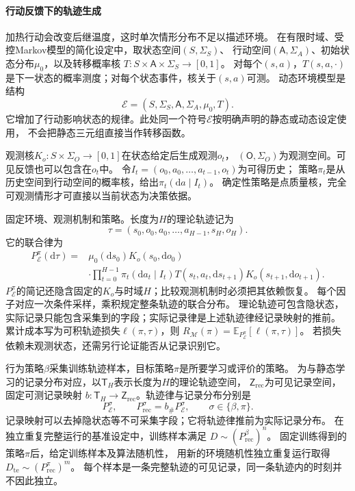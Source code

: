 \paragraph{行动反馈下的轨迹生成}
\label{sec:future-interactive-learning-process}

加热行动会改变后继温度，这时单次情形分布不足以描述环境。
在有限时域、受控Markov模型的简化设定中，取状态空间$(S,\Sigma_S)$、
行动空间$(\mathsf A,\Sigma_A)$、初始状态分布$\mu_0$，以及转移概率核
$T:S\times\mathsf A\times\Sigma_S\to[0,1]$。
对每个$(s,a)$，$T(s,a,\cdot)$是下一状态的概率测度；对每个状态事件，核关于$(s,a)$可测。
动态环境模型是结构
\[
  \mathcal E=(S,\Sigma_S,\mathsf A,\Sigma_A,\mu_0,T).
\]
它增加了行动影响状态的规律。此处同一个符号$\mathcal E$按明确声明的静态或动态设定使用，
不会把静态三元组直接当作转移函数。

观测核$K_o:S\times\Sigma_O\to[0,1]$在状态给定后生成观测$o_t$，
$(\mathsf O,\Sigma_O)$为观测空间。可见反馈也可以包含在$o_t$中。
令$I_t=(o_0,a_0,\ldots,a_{t-1},o_t)$为可得历史；
策略$\pi_t$是从历史空间到行动空间的概率核，给出$\pi_t(\mathrm da\mid I_t)$。
确定性策略是点质量核，完全可观测情形才可直接以当前状态为决策依据。

固定环境、观测机制和策略。长度为$H$的理论轨迹记为
\[
  \tau=(s_0,o_0,a_0,\ldots,a_{H-1},s_H,o_H).
\]
它的联合律为
\begin{equation}
  \begin{aligned}
    P_{\mathcal E}^{\pi}(\mathrm d\tau)
    ={}&\mu_0(\mathrm ds_0)K_o(s_0,\mathrm do_0)\\
      &\cdot\prod_{t=0}^{H-1}
      \pi_t(\mathrm da_t\mid I_t)
      T(s_t,a_t,\mathrm ds_{t+1})K_o(s_{t+1},\mathrm do_{t+1}).
  \end{aligned}
  \label{eq:future-interactive-trajectory-law}
\end{equation}
$P_{\mathcal E}^{\pi}$的简记还隐含固定的$K_o$与时域$H$；比较观测机制时必须把其依赖恢复。
每个因子对应一次条件采样，乘积规定整条轨迹的联合分布。
理论轨迹可包含隐状态，实际记录只能包含采集到的字段；实际记录律是上述轨迹律经记录映射的推前。
累计成本写为可积轨迹损失$\ell(\pi,\tau)$，则
$R_{\mathcal M}(\pi)=\mathbb E_{P_{\mathcal E}^{\pi}}[\ell(\pi,\tau)]$。
若损失依赖未观测状态，还需另行论证能否从记录识别它。

行为策略$\beta$采集训练轨迹样本，目标策略$\pi$是所要学习或评价的策略。
为与静态学习的记录分布对应，以$\mathsf T_H$表示长度为$H$的理论轨迹空间，
$\mathsf Z_{\mathrm{rec}}$为可见记录空间，固定可测记录映射
$b:\mathsf T_H\to\mathsf Z_{\mathrm{rec}}$。轨迹律与记录分布分别是
\[
  P_{\mathcal E}^{\sigma},\qquad
  P_{\mathrm{rec}}^{\sigma}=b_{\#}P_{\mathcal E}^{\sigma},
  \qquad \sigma\in\{\beta,\pi\}.
\]
记录映射可以去掉隐状态等不可采集字段；它将轨迹律推前为实际记录分布。
在独立重复完整运行的基准设定中，训练样本满足
$D\sim(P_{\mathrm{rec}}^{\beta})^n$。
固定训练得到的策略$\pi$后，给定训练样本及算法随机性，
用新的环境随机性独立重复运行取得$D_{\mathrm{te}}\sim(P_{\mathrm{rec}}^{\pi})^m$。
每个样本是一条完整轨迹的可见记录，同一条轨迹内的时刻并不因此独立。

